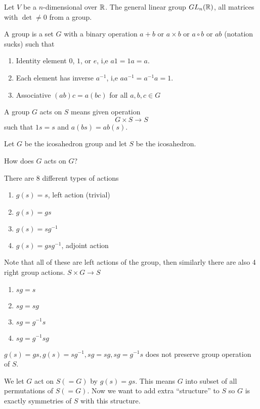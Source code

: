 \begin{example}
	Let $V$ be a $n$-dimensional over $\mathbb R$. The general linear group $GL_n(\mathbb R)$, all matrices with $\det \neq 0$ from a group. 
\end{example}
\begin{definition}
	A group is a set $G$ with a binary operation $a + b$ or $a \times b$ or $a \circ b$ or $ab$ (notation sucks) such that
	\begin{enumerate}
		\item Identity element $0$, $1$, or $e$, i,e $a1 = 1a = a$.
		\item Each element has inverse $a^{-1}$, i,e $aa^{-1} = a^{-1}a = 1$.
		\item Associative $(ab)c = a(bc)$ for all $a,b,c \in G$
	\end{enumerate}
\end{definition}
\begin{definition}
	A group $G$ acts on $S$ means given operation 
	\[ G \times S \to S \]
	such that $1s = s$ and $a(bs) = ab(s)$.
\end{definition}
\begin{example}
	Let $G$ be the icosahedron group and let $S$ be the icosahedron.
\end{example}

\begin{question}
	How does $G$ acts on $G$?
\end{question}
\begin{definition}
	There are 8 different types of actions
	\begin{enumerate}
		\item $g(s) = s$, left action (trivial)
		\item $g(s) = gs$
		\item $g(s) = sg^{-1}$
		\item $g(s) = gsg^{-1}$, adjoint action
	\end{enumerate}
	Note that all of these are left actions of the group, then similarly there are also 4 right group actions. $S \times G \to S$
	\begin{enumerate}
		\item $sg = s$
		\item $sg = sg$
		\item $sg = g^{-1} s$
		\item $sg = g^{-1}sg$
	\end{enumerate}
\end{definition}
\begin{remark}
	$g(s) = gs, g(s) = sg^{-1}, sg = sg, sg = g^{-1}s$ does not preserve group operation of $S$.
\end{remark}
We let $G$ act on $S(=G)$ by $g(s) = gs$. This means $G$ into subset of all permutations of $S(=G)$. Now we want to add extra ``structure'' to $S$ so $G$ is exactly symmetries of $S$ with this structure.

